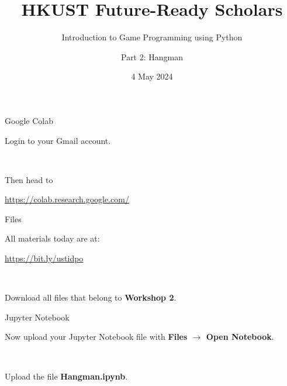 \documentclass[dvipsnames, svgnames, x11names]{beamer}
\title[HKUST Future-Ready Scholars]{HKUST Future-Ready Scholars}
\subtitle{Introduction to Game Programming using Python}
\author[Game Programming using Python]{Part 2: Hangman}
\date[May 2024]{4 May 2024}
\begin{document}

\frame{\titlepage}

\begin{frame}[fragile]{Google Colab}
    \begin{center}
        Login to your Gmail account.

        \

        Then head to

        \href{https://colab.research.google.com/}{https://colab.research.google.com/}
    \end{center}
\end{frame}

\begin{frame}[fragile]{Files}
    \begin{center}
        All materials today are at:

        \href{https://bit.ly/ustidpo}{https://bit.ly/ustidpo}

        \


        Download all files that belong to \textbf{Workshop 2}.
    \end{center}
\end{frame}

\begin{frame}[fragile]{Jupyter Notebook}
    \begin{center}
        Now upload your Jupyter Notebook file with \textbf{Files $\rightarrow$ Open Notebook}.
    
        \


        Upload the file \textbf{Hangman.ipynb}.
    
    \end{center}
\end{frame}
\end{document}

